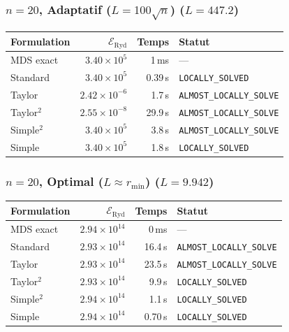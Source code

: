 \subsubsection{$n=20$, Adaptatif ($L{=}100\sqrt{n}$) ($L=447.2$)}
\begin{longtable}{@{}lrrl@{}}
  \toprule
  Formulation & $\mathcal{E}_{\mathrm{Ryd}}$ & Temps & Statut \\
  \midrule
  \endhead
  MDS exact & $3.40\times10^{5}$ & 1\,ms & --- \\
  Standard & $3.40\times10^{5}$ & 0.39\,s & \texttt{LOCALLY\_SOLVED} \\
  Taylor & $2.42\times10^{-6}$ & 1.7\,s & \texttt{ALMOST\_LOCALLY\_SOLVE} \\
  Taylor$^2$ & $2.55\times10^{-8}$ & 29.9\,s & \texttt{ALMOST\_LOCALLY\_SOLVE} \\
  Simple$^2$ & $3.40\times10^{5}$ & 3.8\,s & \texttt{ALMOST\_LOCALLY\_SOLVE} \\
  Simple & $3.40\times10^{5}$ & 1.8\,s & \texttt{LOCALLY\_SOLVED} \\
  \bottomrule
\end{longtable}

\subsubsection{$n=20$, Optimal ($L{\approx}r_{\min}$) ($L=9.942$)}
\begin{longtable}{@{}lrrl@{}}
  \toprule
  Formulation & $\mathcal{E}_{\mathrm{Ryd}}$ & Temps & Statut \\
  \midrule
  \endhead
  MDS exact & $2.94\times10^{14}$ & 0\,ms & --- \\
  Standard & $2.93\times10^{14}$ & 16.4\,s & \texttt{ALMOST\_LOCALLY\_SOLVE} \\
  Taylor & $2.93\times10^{14}$ & 23.5\,s & \texttt{ALMOST\_LOCALLY\_SOLVE} \\
  Taylor$^2$ & $2.93\times10^{14}$ & 9.9\,s & \texttt{LOCALLY\_SOLVED} \\
  Simple$^2$ & $2.94\times10^{14}$ & 1.1\,s & \texttt{LOCALLY\_SOLVED} \\
  Simple & $2.94\times10^{14}$ & 0.70\,s & \texttt{LOCALLY\_SOLVED} \\
  \bottomrule
\end{longtable}

